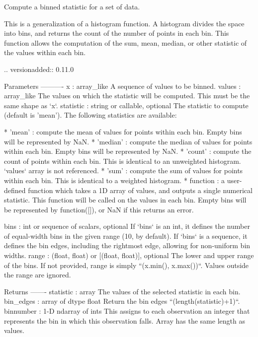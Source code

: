 \begin{DoxyVerb}Compute a binned statistic for a set of data.

This is a generalization of a histogram function.  A histogram divides
the space into bins, and returns the count of the number of points in
each bin.  This function allows the computation of the sum, mean, median,
or other statistic of the values within each bin.

.. versionadded:: 0.11.0

Parameters
----------
x : array_like
    A sequence of values to be binned.
values : array_like
    The values on which the statistic will be computed.  This must be
    the same shape as `x`.
statistic : string or callable, optional
    The statistic to compute (default is 'mean').
    The following statistics are available:

      * 'mean' : compute the mean of values for points within each bin.
        Empty bins will be represented by NaN.
      * 'median' : compute the median of values for points within each
        bin. Empty bins will be represented by NaN.
      * 'count' : compute the count of points within each bin.  This is
        identical to an unweighted histogram.  `values` array is not
        referenced.
      * 'sum' : compute the sum of values for points within each bin.
        This is identical to a weighted histogram.
      * function : a user-defined function which takes a 1D array of
        values, and outputs a single numerical statistic. This function
        will be called on the values in each bin.  Empty bins will be
        represented by function([]), or NaN if this returns an error.

bins : int or sequence of scalars, optional
    If `bins` is an int, it defines the number of equal-width
    bins in the given range (10, by default). If `bins` is a sequence,
    it defines the bin edges, including the rightmost edge, allowing
    for non-uniform bin widths.
range : (float, float) or [(float, float)], optional
    The lower and upper range of the bins.  If not provided, range
    is simply ``(x.min(), x.max())``.  Values outside the range are
    ignored.

Returns
-------
statistic : array
    The values of the selected statistic in each bin.
bin_edges : array of dtype float
    Return the bin edges ``(length(statistic)+1)``.
binnumber : 1-D ndarray of ints
    This assigns to each observation an integer that represents the bin
    in which this observation falls. Array has the same length as values.


\end{DoxyVerb}
